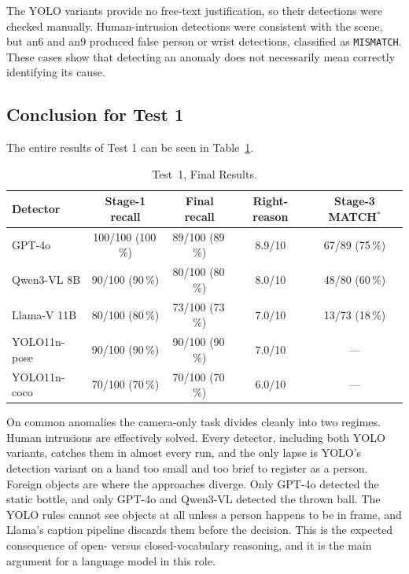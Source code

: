 \documentclass[11pt,a4paper]{article}
\begin{document}
The YOLO variants provide no free-text justification, so their detections
were checked manually. Human-intrusion detections were consistent with the
scene, but an6 and an9 produced false person or wrist detections,
classified as \texttt{MISMATCH}. These cases show that detecting an anomaly
does not necessarily mean correctly identifying its cause.

\subsection{Conclusion for Test 1}

The entire results of Test 1 can be seen in Table~\ref{tab:test1}.

\begin{table}[h]
\centering
\begin{tabular}{@{}l c c c c@{}}
\toprule
Detector & Stage-1 recall & Final recall & Right-reason & Stage-3 MATCH$^{\ast}$ \\
\midrule
GPT-4o          & 100/100 (100\,\%) & 89/100 (89\,\%) & 8.9/10 & 67/89 (75\,\%) \\
Qwen3-VL 8B     & 90/100  (90\,\%)  & 80/100 (80\,\%) & 8.0/10 & 48/80 (60\,\%) \\
Llama-V 11B     & 80/100  (80\,\%)  & 73/100 (73\,\%) & 7.0/10 & 13/73 (18\,\%) \\
YOLO11n-pose    & 90/100  (90\,\%)  & 90/100 (90\,\%) & 7.0/10 & --- \\
YOLO11n-coco    & 70/100  (70\,\%)  & 70/100 (70\,\%) & 6.0/10 & --- \\
\bottomrule
\end{tabular}
\caption{Test~1, Final Results.}
\label{tab:test1}
\end{table}
\FloatBarrier

On common anomalies the camera-only task divides cleanly into two regimes.
Human intrusions are effectively solved. Every detector, including both
YOLO variants, catches them in almost every run, and the only lapse is
YOLO's detection variant on a hand too small and too brief to register as
a person. Foreign objects are where the approaches diverge. Only GPT-4o
detected the static bottle, and only GPT-4o and Qwen3-VL detected the
thrown ball. The YOLO rules cannot see objects at all unless a person
happens to be in frame, and Llama's caption pipeline discards them before
the decision. This is the expected consequence of open- versus
closed-vocabulary reasoning, and it is the main argument for a language
model in this role.
\end{document}
